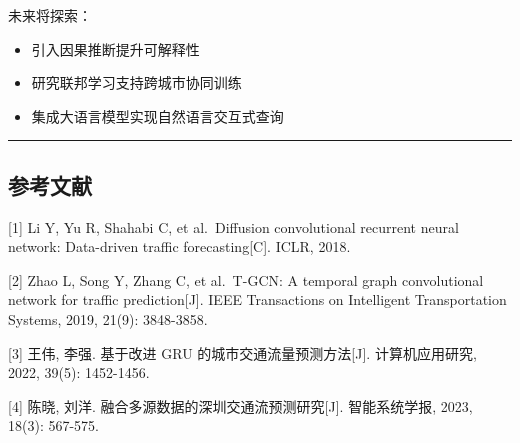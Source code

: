 \documentclass{harryopo-mathnotes}
\begin{document}
未来将探索：

\begin{itemize}
\tightlist
\item
  引入因果推断提升可解释性
\item
  研究联邦学习支持跨城市协同训练
\item
  集成大语言模型实现自然语言交互式查询
\end{itemize}

\begin{center}\rule{0.5\linewidth}{0.5pt}\end{center}

\subsection{参考文献}\label{ux53c2ux8003ux6587ux732e}

{[}1{]} Li Y, Yu R, Shahabi C, et al.~Diffusion convolutional recurrent
neural network: Data-driven traffic forecasting{[}C{]}. ICLR, 2018.

{[}2{]} Zhao L, Song Y, Zhang C, et al.~T-GCN: A temporal graph
convolutional network for traffic prediction{[}J{]}. IEEE Transactions
on Intelligent Transportation Systems, 2019, 21(9): 3848-3858.

{[}3{]} 王伟, 李强. 基于改进 GRU 的城市交通流量预测方法{[}J{]}.
计算机应用研究, 2022, 39(5): 1452-1456.

{[}4{]} 陈晓, 刘洋. 融合多源数据的深圳交通流预测研究{[}J{]}.
智能系统学报, 2023, 18(3): 567-575.
\end{document}
